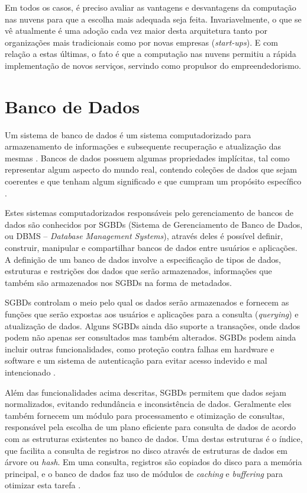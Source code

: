 \documentclass[diss]{template/setrem}
\begin{document}
Em todos os casos, é preciso avaliar as vantagens e desvantagens da computação nas nuvens para que a escolha mais adequada seja feita. Invariavelmente, o que se vê atualmente é uma adoção cada vez maior desta arquitetura tanto por organizações mais tradicionais como por novas empresas (\emph{start-ups}). E com relação a estas últimas, o fato é que a computação nas nuvens permitiu a rápida implementação de novos serviços, servindo como propulsor do empreendedorismo.

\section{Banco de Dados}
\label{sec:bancodedados}
Um sistema de banco de dados é um sistema computadorizado para armazenamento de informações e subsequente recuperação e atualização das mesmas \citep{Date2004}. Bancos de dados possuem algumas propriedades implícitas, tal como representar algum aspecto do mundo real, contendo coleções de dados que sejam coerentes e que tenham algum significado e que cumpram um propósito específico \citep{Elmasri2011}.

Estes sistemas computadorizados responsáveis pelo gerenciamento de bancos de dados são conhecidos por SGBDs (Sistema de Gerenciamento de Banco de Dados, ou DBMS -- \emph{Database Management Systems}), através deles é possível definir, construir, manipular e compartilhar bancos de dados entre usuários e aplicações. A definição de um banco de dados involve a especificação de tipos de dados, estruturas e restrições dos dados que serão armazenados, informações que também são armazenados nos SGBDs na forma de metadados.

SGBDs controlam o meio pelo qual os dados serão armazenados e fornecem as funções que serão expostas aos usuários e aplicações para a consulta (\emph{querying}) e atualização de dados. Alguns SGBDs ainda dão suporte a transações, onde dados podem não apenas ser consultados mas também alterados. SGBDs podem ainda incluir outras funcionalidades, como proteção contra falhas em hardware e software e um sistema de autenticação para evitar acesso indevido e mal intencionado \citep{Elmasri2011}.

Além das funcionalidades acima descritas, SGBDs permitem que dados sejam normalizados, evitando redundância e inconsistência de dados. Geralmente eles também fornecem um módulo para processamento e otimização de consultas, responsável pela escolha de um plano eficiente para consulta de dados de acordo com as estruturas existentes no banco de dados. Uma destas estruturas é o índice, que facilita a consulta de registros no disco através de estruturas de dados em árvore ou \emph{hash}. Em uma consulta, registros são copiados do disco para a memória principal, e o banco de dados faz uso de módulos de \emph{caching} e \emph{buffering} para otimizar esta tarefa \citep{Elmasri2011}.
\end{document}
